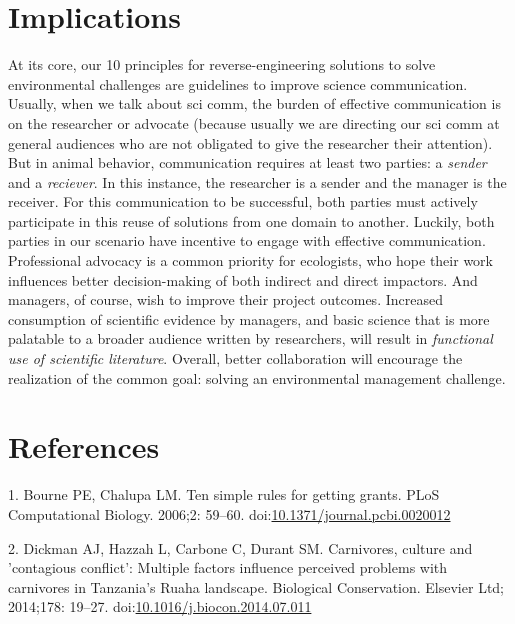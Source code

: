 \documentclass[10pt,letterpaper]{article}
\begin{document}
\section{Implications}\label{implications}

At its core, our 10 principles for reverse-engineering solutions to
solve environmental challenges are guidelines to improve science
communication. Usually, when we talk about sci comm, the burden of
effective communication is on the researcher or advocate (because
usually we are directing our sci comm at general audiences who are not
obligated to give the researcher their attention). But in animal
behavior, communication requires at least two parties: a \emph{sender}
and a \emph{reciever}. In this instance, the researcher is a sender and
the manager is the receiver. For this communication to be successful,
both parties must actively participate in this reuse of solutions from
one domain to another. Luckily, both parties in our scenario have
incentive to engage with effective communication. Professional advocacy
is a common priority for ecologists, who hope their work influences
better decision-making of both indirect and direct impactors. And
managers, of course, wish to improve their project outcomes. Increased
consumption of scientific evidence by managers, and basic science that
is more palatable to a broader audience written by researchers, will
result in \emph{functional use of scientific literature}. Overall,
better collaboration will encourage the realization of the common goal:
solving an environmental management challenge.

\section*{References}\label{references}

\hypertarget{refs}{}
\hypertarget{ref-Bourne2006}{}
1. Bourne PE, Chalupa LM. Ten simple rules for getting grants. PLoS
Computational Biology. 2006;2: 59--60.
doi:\href{https://doi.org/10.1371/journal.pcbi.0020012}{10.1371/journal.pcbi.0020012}

\hypertarget{ref-Dickman2014}{}
2. Dickman AJ, Hazzah L, Carbone C, Durant SM. Carnivores, culture and
'contagious conflict': Multiple factors influence perceived problems
with carnivores in Tanzania's Ruaha landscape. Biological Conservation.
Elsevier Ltd; 2014;178: 19--27.
doi:\href{https://doi.org/10.1016/j.biocon.2014.07.011}{10.1016/j.biocon.2014.07.011}
\end{document}
